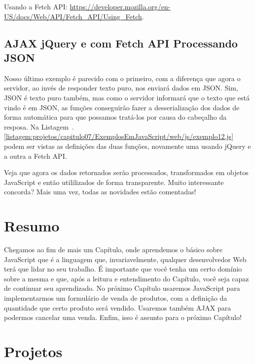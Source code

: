 \begin{saibaMais}
    Usando a Fetch API: \url{https://developer.mozilla.org/en-US/docs/Web/API/Fetch_API/Using_Fetch}.
\end{saibaMais}


\subsection{AJAX jQuery e com Fetch API Processando JSON}

Nosso último exemplo é parecido com o primeiro, com a diferença que agora o servidor, ao invés de responder texto puro, nos enviará dados em JSON. Sim, JSON é texto puro também, mas como o servidor informará que o texto que está vindo é em JSON, as funções conseguirão fazer a desserialização dos dados de forma automática para que possamos tratá-los por causa do cabeçalho da resposa. Na Listagem~\thechapter.\ref{listagem:projetos/capitulo07/ExemplosEmJavaScript/web/js/exemplo12.js} podem ser vistas as definições das duas funções, novamente uma usando jQuery e a outra a Fetch API.


Veja que agora os dados retornados serão processados, transformados em objetos JavaScript e então utililizados de forma transparente. Muito interessante concorda? Mais uma vez, todas as novidades estão comentadas!



\section{Resumo}

Chegamos ao fim de mais um Capítulo, onde aprendemos o básico sobre JavaScript que é a linguagem que, invariavelmente, qualquer desenvolvedor Web terá que lidar no seu trabalho. É importante que você tenha um certo domínio sobre a mesma e que, após a leitura e entendimento do Capítulo, você seja capaz de continuar seu aprendizado. No próximo Capítulo usaremos JavaScript para implementarmos um formulário de venda de produtos, com a definição da quantidade que certo produto será vendido. Usaremos também AJAX para podermos cancelar uma venda. Enfim, isso é assunto para o próximo Capítulo!



\section{Projetos}

